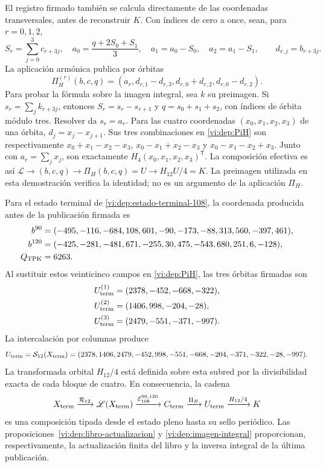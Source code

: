 El registro firmado también se calcula directamente de las coordenadas
transversales, antes de reconstruir \(K\). Con índices de cero a once,
sean, para \(r=0,1,2\),
\[
 S_r=\sum_{j=0}^3c_{r+3j},\quad
 a_0=\frac{q+2S_0+S_1}{3},\quad
 a_1=a_0-S_0,\quad a_2=a_1-S_1,
 \qquad d_{r,j}=b_{r+3j}.
\]
La aplicación armónica publica por órbitas
\begin{equation}
 \Pi_H^{(r)}(b,c,q)=
 (a_r,d_{r,1}-d_{r,3},d_{r,0}+d_{r,2},d_{r,0}-d_{r,2}).
 \label{vi:dep:PiH}
\end{equation}
Para probar la fórmula sobre la imagen integral, sea \(k\) su
preimagen. Si \(s_r=\sum_jk_{r+3j}\), entonces
\(S_r=s_r-s_{r+1}\) y \(q=s_0+s_1+s_2\), con índices de órbita
módulo tres. Resolver da \(s_r=a_r\). Para las cuatro coordenadas
\((x_0,x_1,x_2,x_3)\) de una órbita,
\(d_j=x_j-x_{j+1}\). Sus tres combinaciones en
\eqref{vi:dep:PiH} son respectivamente
\(x_0+x_1-x_2-x_3\), \(x_0-x_1+x_2-x_3\) y
\(x_0-x_1-x_2+x_3\). Junto con \(a_r=\sum_jx_j\), son
exactamente \(H_4(x_0,x_1,x_2,x_3)^{\mathsf T}\).
La composición efectiva es así
\(\mathscr L\to(b,c,q)\to\Pi_H(b,c,q)=U\to H_{12}U/4=K\).
La preimagen utilizada en esta demostración verifica la identidad;
no es un argumento de la aplicación \(\Pi_H\).

Para el estado terminal de \eqref{vi:dep:estado-terminal-108}, la coordenada
producida antes de la publicación firmada es
\begin{align}
 b^{90}={}&(-495,-116,-684,108,601,-90,
              -173,-88,313,560,-397,461),\notag\\
 b^{120}={}&(-425,-281,-481,671,-255,30,
               475,-543,680,251,6,-128),\notag\\
 Q_{\rm TPK}={}&6263.
 \label{vi:dep:canales-terminales}
\end{align}
Al sustituir estos veinticinco campos en \eqref{vi:dep:PiH}, las tres
órbitas firmadas son
\begin{align*}
 U_{\rm term}^{(1)}&=(2378,-452,-668,-322),\\
 U_{\rm term}^{(2)}&=(1406,998,-204,-28),\\
 U_{\rm term}^{(3)}&=(2479,-551,-371,-997).
\end{align*}
La intercalación por columnas produce
\begin{equation}
 U_{\rm term}=\mathcal S_{12}(X_{\rm term})
 =(2378,1406,2479,-452,998,-551,-668,-204,-371,-322,-28,-997).
 \label{vi:dep:U-terminal}
\end{equation}
La transformada orbital \(H_{12}/4\) está definida sobre esta subred por
la divisibilidad exacta de cada bloque de cuatro. En consecuencia, la cadena
\begin{equation}
 X_{\rm term}\xrightarrow{\mathcal R_{12}}\mathscr L(X_{\rm term})
 \xrightarrow{\mathcal E_{108}^{90,120}}C_{\rm term}
 \xrightarrow{\Pi_H}U_{\rm term}
 \xrightarrow{H_{12}/4}K
 \label{vi:dep:cadena-terminal-completa}
\end{equation}
es una composición tipada desde el estado pleno hasta su sello periódico.
Las proposiciones~\ref{vi:dep:libro-actualizacion} y
\ref{vi:dep:imagen-integral} proporcionan, respectivamente, la actualización
finita del libro y la inversa integral de la última publicación.

